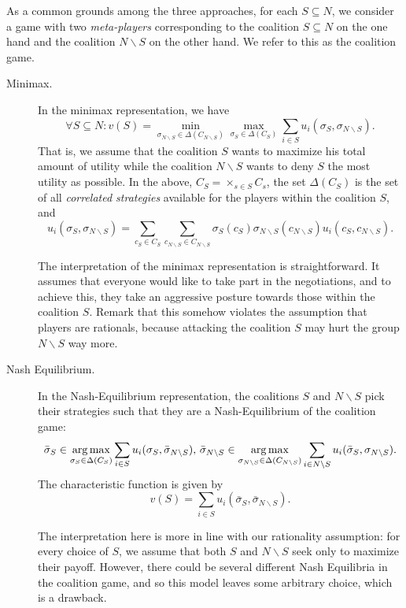 As a common grounds among the three approaches, for each $S \subseteq N$,
we consider a game with two \emph{meta-players} corresponding to the coalition $S \subseteq N$ on the one hand and the coalition $N \backslash S$ on the other hand. We refer to this as the coalition game.

\begin{description}
	\item[Minimax.] In the minimax representation, we have
	$$ \forall S \subseteq N: v(S) = \min_{\sigma_{N \backslash S} \in \Delta(C_{N \backslash S})} \max_{\sigma_{S} \in \Delta(C_{S})} \sum_{i \in S} u_i(\sigma_S, \sigma_{N \backslash S}). $$
	That is, we assume that the coalition $S$ wants to maximize his total amount of utility while the coalition $N \backslash S$ wants to deny $S$ the most utility as possible.
	In the above, $C_S = \times_{s \in S} C_s$, the set $\Delta(C_{S})$ is the set of all \emph{correlated strategies} available for the players within the coalition $S$, and
	$$ u_i(\sigma_S, \sigma_{N \backslash S}) = \sum_{c_S \in C_S} \sum_{c_{N \backslash S} \in C_{{N \backslash S}}} \sigma_S(c_S)\sigma_{N \backslash S}(c_{{N \backslash S}}) u_i(c_S, c_{N \backslash S}).$$

	The interpretation of the minimax representation is straightforward. It assumes that everyone would like to take part in the negotiations, and to achieve this, they take an aggressive posture towards those within the coalition $S$. Remark that this somehow violates the  assumption  that players are rationals, because attacking the coalition $S$ may hurt the group $N \backslash S$ way more.

	\item[Nash Equilibrium.] In the Nash-Equilibrium representation, the coalitions $S$ and $N \backslash S$ pick their strategies such that they are a Nash-Equilibrium of the coalition game:
	$$ \bar{\sigma}_S \in \operatorname*{arg\,max}_{\sigma_S \in \Delta(C_S)} \sum_{i \in S} u_i(\sigma_S, \bar{\sigma}_{N \backslash S}), \, \bar{\sigma}_{N \backslash S} \in \operatorname*{arg\,max}_{\sigma_{N \backslash S} \in \Delta(C_{N \backslash S})} \sum_{i \in {N \backslash S}} u_i(\bar{\sigma}_S, {\sigma}_{N \backslash S}).$$
 The characteristic function is given by
	$$v(S) = \sum_{i \in S} u_i(\bar{\sigma}_S, \bar{\sigma}_{N \backslash S}).$$

	The interpretation here	is more in line with our rationality assumption: for every choice of $S$, we assume that both $S$ and $N \backslash S$ seek only to maximize their payoff. However, there could be several different Nash Equilibria in the coalition game, and so this model leaves some arbitrary choice, which is a drawback.


\end{description}
